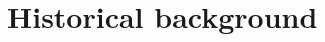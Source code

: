 \documentclass[\rootfolder/main.tex]{subfiles}
\begin{document}
\chapter{Historical background} %

\label{Chapter01} %




\end{document}
